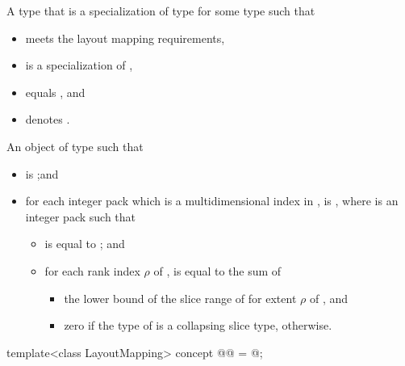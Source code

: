 \begin{itemdescr}
\pnum
\result
A type  that is a specialization of type  for some type  such that
\begin{itemize}
\item {} meets the layout mapping requirements,
\item {} is a specialization of ,
\item {} equals
, and
\item {} denotes .
\end{itemize}

\pnum
\returns
An object  of type  such that
\begin{itemize}
\item
  is ;\newline and
\item
  for each integer pack 
  which is a multidimensional index in ,\newline
   is ,
  where  is an integer pack such that
  \begin{itemize}
  \item
     is equal to ; and
  \item
    for each rank index $\rho$ of ,
     is equal to the sum of
    \begin{itemize}
    \item
      the lower bound of the  slice range of 
      for extent $\rho$ of , and
    \item
      zero if the type of  is a collapsing slice type,
       otherwise.
    \end{itemize}
  \end{itemize}
\end{itemize}
\end{itemdescr}

\begin{itemdecl}
template<class LayoutMapping>
  concept @@ = @\seebelow@;
\end{itemdecl}

